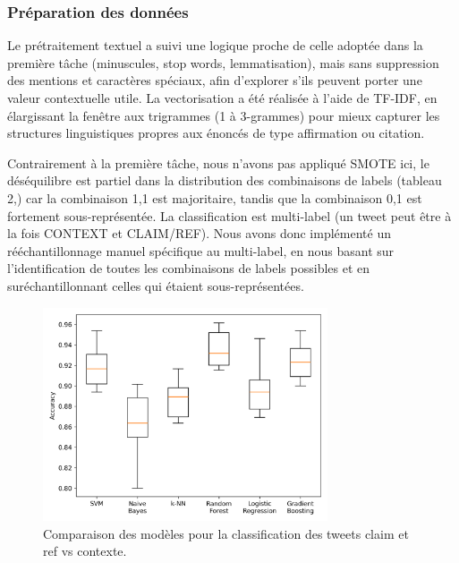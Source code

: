 \subsubsection{Préparation des données}
Le prétraitement textuel a suivi une logique proche de celle adoptée dans la première tâche (minuscules, stop words, lemmatisation), mais sans suppression des mentions et caractères spéciaux, afin d’explorer s’ils peuvent porter une valeur contextuelle utile.
La vectorisation a été réalisée à l’aide de TF-IDF, en élargissant la fenêtre aux trigrammes (1 à 3-grammes) pour mieux capturer les structures linguistiques propres aux énoncés de type affirmation ou citation.

Contrairement à la première tâche, nous n’avons pas appliqué SMOTE ici, le déséquilibre est partiel dans la distribution des combinaisons de labels (tableau 2,) car la combinaison {1,1} est majoritaire, tandis que la combinaison {0,1} est fortement sous-représentée.
La classification est multi-label (un tweet peut être à la fois CONTEXT et CLAIM/REF).
Nous avons donc implémenté un rééchantillonnage manuel spécifique au multi-label, en nous basant sur l’identification de toutes les combinaisons de labels possibles et en suréchantillonnant celles qui étaient sous-représentées.

\begin{figure}[H]
    \centering
    \includegraphics[width=0.75\textwidth]{images/model_comparison_2}
    \caption{Comparaison des modèles pour la classification des tweets claim et ref vs contexte.}
    \label{fig:model_comparison_clmref_context}
\end{figure}

